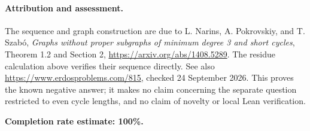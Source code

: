 \paragraph{Attribution and assessment.}
The sequence and graph construction are due to L. Narins, A. Pokrovskiy, and T. Szab\'o, \emph{Graphs without proper subgraphs of minimum degree 3 and short cycles}, Theorem 1.2 and Section 2, \url{https://arxiv.org/abs/1408.5289}. The residue calculation above verifies their sequence directly. See also \url{https://www.erdosproblems.com/815}, checked 24 September 2026. This proves the known negative answer; it makes no claim concerning the separate question restricted to even cycle lengths, and no claim of novelty or local Lean verification.

\textbf{Completion rate estimate: 100\%.}
